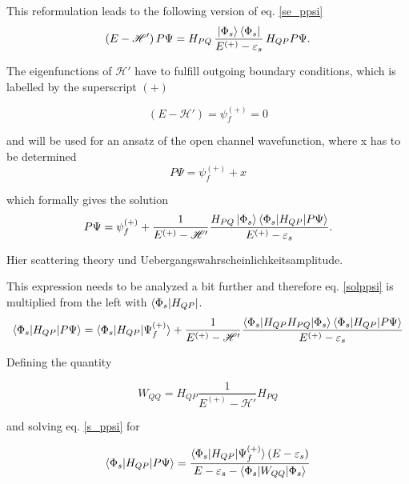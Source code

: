This reformulation leads to the following version of eq. \ref{se_ppsi}
\begin{equation}
  (E - \mathscr{H}')\, P \Psi =
   H_{PQ} \,\frac{\ket{\Phi_s}\bra{\Phi_s}}{E^{(+)}-\varepsilon_s}\, H_{QP} P \Psi .
\end{equation}

The eigenfunctions of $\mathscr{H}'$ have to fulfill outgoing boundary conditions,
which is labelled by the superscript $(+)$

\begin{equation}
  (E-\mathscr{H}') = \psi_f^{(+)} = 0 \label{sol_outg}
\end{equation}

and will be used for an ansatz of the open channel wavefunction, where x has to
be determined
\begin{equation}
  P \Psi = \psi_f^{(+)} + x
\end{equation}

which formally gives the solution
\begin{equation}\label{sol_ppsi}
  P \Psi = \psi_f^{(+)} + \frac{1}{E^{(+)} - \mathscr{H}'}
           \frac{H_{PQ}\ket{\Phi_s}
           \braket{\Phi_s|H_{QP}|P\Psi}}{E^{(+)} - \varepsilon_s} .
\end{equation}

Hier scattering theory und Uebergangswahrscheinlichkeitsamplitude.

This expression needs to be analyzed a bit further and therefore eq. \ref{solppsi}
is multiplied from the left with $\bra{\Phi_s|H_{QP}}$.
\begin{equation}
  \braket{\Phi_s|H_{QP}|P\Psi} = \braket{\Phi_s|H_{QP}|\Psi_f^{(+)}} +
  \frac{1}{E^{(+)} - \mathscr{H}'}
  \frac{\braket{\Phi_s|H_{QP}H_{PQ}|\Phi_s} \braket{\Phi_s|H_{QP}|P\Psi}}
       {E^{(+)} - \varepsilon_s}  \label{s_ppsi}
\end {equation}

Defining the quantity

\begin{equation}
  W_{QQ} = H_{QP}\frac{1}{E^{(+)} - \mathscr{H}'}H_{PQ}
\end{equation}

and solving eq. \ref{s_ppsi} for

\begin{equation}
  \braket{\Phi_s|H_{QP}|P\Psi} = \frac{\braket{\Phi_s|H_{QP}|\Psi_f^{(+)}}(E-\varepsilon_s)}
{E - \varepsilon_s - \braket{\Phi_s|W_{QQ}|\Phi_s}}
\end{equation}

